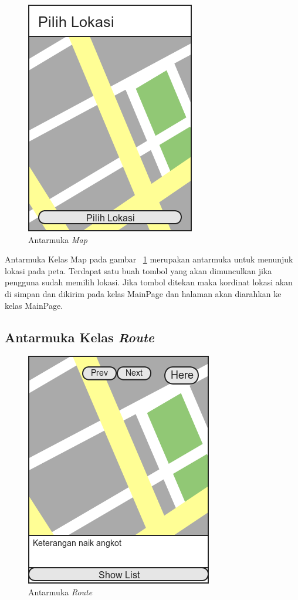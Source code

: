 \begin{figure}[h]
	\centering
		\includegraphics[scale=0.6]{Gambar/perancangan_antarmuka/Map}
	\caption{Antarmuka \textit{Map}}
	\label{fig:Antarmuka Map}
\end{figure}

\hspace{0.5cm} Antarmuka Kelas Map pada gambar ~\ref{fig:Antarmuka Map} merupakan antarmuka untuk menunjuk lokasi pada peta. Terdapat satu buah tombol yang akan dimunculkan jika pengguna sudah memilih lokasi. Jika tombol ditekan maka kordinat lokasi akan di simpan dan dikirim pada kelas MainPage dan halaman akan diarahkan ke kelas MainPage.

\subsection{Antarmuka Kelas \textit{Route}}
\label{lab:Antarmuka Kelas Route}

\begin{figure}[h]
	\centering
		\includegraphics[scale=0.6]{Gambar/perancangan_antarmuka/Route}
	\caption{Antarmuka \textit{Route}}
	\label{fig:Antarmuka Route}
\end{figure}

